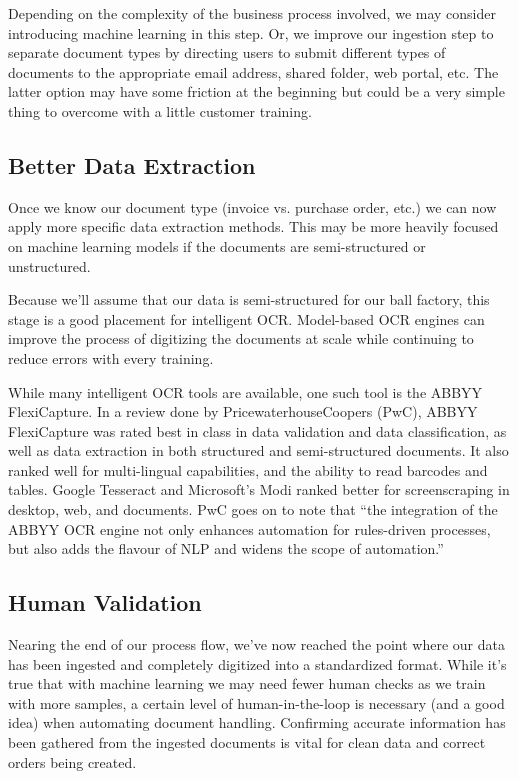 \documentclass[conference]{IEEEtran}
\begin{document}
Depending on the complexity of the business process involved, we may consider introducing machine learning in this step. Or, we improve our ingestion step to separate document types by directing users to submit different types of documents to the appropriate email address, shared folder, web portal, etc. The latter option may have some friction at the beginning but could be a very simple thing to overcome with a little customer training.

\subsection{Better Data Extraction}
Once we know our document type (invoice vs. purchase order, etc.) we can now apply more specific data extraction methods. This may be more heavily focused on machine learning models if the documents are semi-structured or unstructured.

Because we'll assume that our data is semi-structured for our ball factory, this stage is a good placement for intelligent OCR. Model-based OCR engines can improve the process of digitizing the documents at scale while continuing to reduce errors with every training.

While many intelligent OCR tools are available, one such tool is the ABBYY FlexiCapture. In a review done by PricewaterhouseCoopers (PwC), ABBYY FlexiCapture was rated best in class in data validation and data classification, as well as data extraction in both structured and semi-structured documents. It also ranked well for multi-lingual capabilities, and the ability to read barcodes and tables. Google Tesseract and Microsoft's Modi ranked better for screenscraping in desktop, web, and documents. PwC goes on to note that ``the integration of the ABBYY OCR engine not only enhances automation for rules-driven processes, but also adds the flavour of NLP and widens the scope of automation.'' \cite{pwc2018robotic}

\subsection{Human Validation}
Nearing the end of our process flow, we've now reached the point where our data has been ingested and completely digitized into a standardized format. While it's true that with machine learning we may need fewer human checks as we train with more samples, a certain level of human-in-the-loop is necessary (and a good idea) when automating document handling. Confirming accurate information has been gathered from the ingested documents is vital for clean data and correct orders being created.
\end{document}
